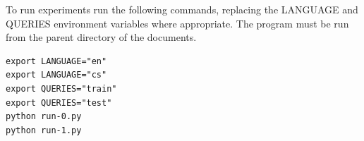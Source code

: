 \documentclass[a4paper]{article}
\begin{document}
To run experiments run the following commands, replacing the LANGUAGE
and QUERIES environment variables where appropriate. The program must
be run from the parent directory of the documents.
\begin{verbatim}
export LANGUAGE="en"
export LANGUAGE="cs"
export QUERIES="train"
export QUERIES="test"
python run-0.py
python run-1.py
\end{verbatim}
\end{document}
